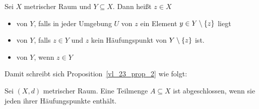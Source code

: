\begin{Definition}{%
	Sei $X$ metrischer Raum und $Y \subseteq X$. Dann heißt $z \in X$
	\begin{itemize}
		\item {} von $Y$, falls in jeder Umgebung $U$ von 
			$z$ ein Element $y \in Y \setminus \{z\}$ liegt
		\item {} von $Y$, falls $z \in Y$ und $z$ kein 
			Häufungspunkt von $Y \setminus \{z\}$ ist.
		\item {} von $Y$, wenn $z \in Y$
	\end{itemize}
}\end{Definition}
Damit schreibt sich Proposition~\ref{vl_23_prop_2}
	wie folgt:
\begin{Proposition}{%
	Sei $(X,d)$ metrischer Raum. Eine Teilmenge $A \subseteq X$ ist abgeschlossen, 
	wenn sie jeden ihrer Häufungspunkte enthält.
}\end{Proposition}

